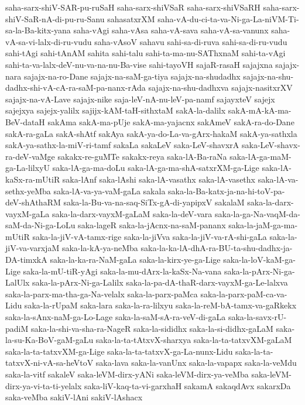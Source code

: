 {saha-sarx-shiV-SAR-pu-ruSaH
saha-sarx-shiVSaR
saha-sarx-shiVSaRH
saha-sarx-shiV-SaR-nA-di-pu-ru-Sanu
sahasatxrXM
saha-vA-du-ci-ta-va-Ni-ga-La-niVM-Ti-sa-la-Ba-kitx-yana
saha-vAgi
saha-vAsa
saha-vA-sava
saha-vA-sa-vanunx
saha-vA-sa-vi-lalx-di-ru-vudu
saha-vAsoV
sahavu
sahi-sa-di-ruva
sahi-sa-di-ru-vudu
sahi-tAgi
sahi-tAnAM
sahita
sahi-talu
sahi-ta-ma-nu-SAThxnaM
sahi-ta-vAgi
sahi-ta-va-lalx-deV-nu-va-na-nu-Ba-vise
sahi-tayoVH
sajaR-rasaH
sajajxna
sajajx-nara
sajajx-na-ro-Dane
sajajx-na-saM-ga-tiya
sajajx-na-shudadhx
sajajx-na-shu-dadhx-shi-vA-cA-ra-saM-pa-nanx-rAda
sajajx-na-shu-dadhxva
sajajx-nasitxrXV
sajajx-na-vA-Lave
sajajx-nike
saja-leV-nA-nu-leV-pa-namf
sajayxteV
sajejx
sajejxya
sajejx-yalilx
sajijx-kAM-taH-sithxtaM
sakA-la-dalilx
sakA-mA-kA-ma-BeV-dataH
sakAma
sakA-ma-pUje
sakA-ma-yajacnx
sakAmeV
sakA-ra-do-Dane
sakA-ra-gaLa
sakA-shAtf
sakAya
sakA-ya-do-La-va-gArx-hakaM
sakA-ya-sathxla
sakA-ya-sathx-la-miV-ri-tamf
sakaLa
sakaLeV
saka-LeV-shavxrA
saka-LeV-shavx-ra-deV-vaMge
sakakx-re-guMTe
sakakx-reya
saka-lA-Ba-raNa
saka-lA-ga-maM-ga-La-lilxyU
saka-lA-ga-ma-doLu
saka-lA-ga-ma-shA-satxrXM-ga-Lige
saka-lA-kaSx-ra-mUtiR
saka-lAnf
saka-lAshi
saka-lA-vasathx
saka-lA-vasethx
saka-lA-va-sethx-yeMba
saka-lA-va-ya-vaM-gaLa
sakala
saka-la-Ba-katx-ja-na-hi-toV-pa-deV-shAthaRM
saka-la-Bu-va-na-saq-SiTx-gA-di-yapipxV
sakalaM
saka-la-darx-vayxM-gaLa
saka-la-darx-vayxM-gaLaM
saka-la-deV-vara
saka-la-ga-Na-vaqM-da-saM-da-Ni-ga-LoLu
saka-lageR
saka-la-jAcnx-na-saM-pananx
saka-la-jaM-ga-ma-mUtiR
saka-la-jiV-vA-tamx-rige
saka-la-jiVva
saka-la-jiV-va-rA-shi-gaLa
saka-la-jiV-va-varxjaM
saka-la-kA-ya-neMba
saka-la-ka-lA-dhA-ra-BU-ta-shu-dadhx-ja-DA-timxkA
saka-la-ka-ra-NaM-gaLa
saka-la-kirx-ye-ga-Lige
saka-la-loV-kaM-ga-Lige
saka-la-mU-tiR-yAgi
saka-la-mu-dArx-la-kaSx-Na-vana
saka-la-pArx-Ni-ga-LalUlx
saka-la-pArx-Ni-ga-Lalilx
saka-la-pa-dA-thaR-darx-vayxM-ga-Le-lalxva
saka-la-parx-ma-tha-ga-Na-velalx
saka-la-parx-paMca
saka-la-parx-paM-ca-va-Lidu
saka-la-rUpaM
saka-lara
saka-la-ra-lilxyu
saka-la-reM-bA-tamx-va-gaRkekx
saka-la-sAnx-naM-ga-Lo-Lage
saka-la-saM-sA-ra-veV-di-gaLa
saka-la-savx-rU-padiM
saka-la-shi-va-sha-ra-NageR
saka-la-sididhx
saka-la-si-didhx-gaLaM
saka-la-su-Ka-BoV-gaM-gaLu
saka-la-ta-tAtxvX-sharxya
saka-la-ta-tatxvXM-gaLaM
saka-la-ta-tatxvXM-ga-Lige
saka-la-ta-tatxvX-ga-La-nunx-Lidu
saka-la-ta-tatxvX-ni-vA-sa-heVtoV
saka-lava
saka-la-vanUnx
saka-la-vapapx
saka-la-veMdu
saka-la-vitf
sakaleV
saka-leVM-dirx-yANi
saka-leVM-dirx-ya-veMba
saka-leVM-dirx-ya-vi-ta-ti-yelalx
saka-liV-kaq-ta-vi-garxhaH
sakamA
sakaqdAvx
sakarxDa
saka-veMba
sakiV-lAni
sakiV-lAshacx
}
